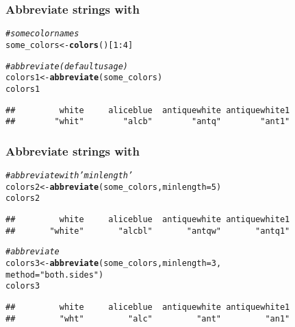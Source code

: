 \documentclass[12pt]{beamer}\usepackage[]{graphicx}\usepackage[]{color}
\makeatletter
\newcommand{\hlnum}[1]{\textcolor[rgb]{0.686,0.059,0.569}{#1}}%
\newcommand{\hlstr}[1]{\textcolor[rgb]{0.192,0.494,0.8}{#1}}%
\newcommand{\hlcom}[1]{\textcolor[rgb]{0.678,0.584,0.686}{\textit{#1}}}%
\newcommand{\hlopt}[1]{\textcolor[rgb]{0,0,0}{#1}}%
\newcommand{\hlstd}[1]{\textcolor[rgb]{0.345,0.345,0.345}{#1}}%
\newcommand{\hlkwb}[1]{\textcolor[rgb]{0.69,0.353,0.396}{#1}}%
\newcommand{\hlkwc}[1]{\textcolor[rgb]{0.333,0.667,0.333}{#1}}%
\newcommand{\hlkwd}[1]{\textcolor[rgb]{0.737,0.353,0.396}{\textbf{#1}}}%
\newenvironment{kframe}{%
 \def\at@end@of@kframe{}%
 \ifinner\ifhmode%
  \def\at@end@of@kframe{\end{minipage}}%
  \begin{minipage}{\columnwidth}%
 \fi\fi%
 \def\FrameCommand##1{\hskip\@totalleftmargin \hskip-\fboxsep
 \colorbox{shadecolor}{##1}\hskip-\fboxsep
     \hskip-\linewidth \hskip-\@totalleftmargin \hskip\columnwidth}%
 \MakeFramed {\advance\hsize-\width
   \@totalleftmargin\z@ \linewidth\hsize
   \@setminipage}}%
 {\par\unskip\endMakeFramed%
 \at@end@of@kframe}
\newenvironment{knitrout}{}{} %
\makeatother
\begin{document}
\begin{frame}[fragile]
\frametitle{Abbreviate strings with }

\begin{knitrout}\footnotesize
{}\color{fgcolor}\begin{kframe}
\begin{alltt}
\hlcom{# some color names}
\hlstd{some_colors} \hlkwb{<-} \hlkwd{colors}\hlstd{()[}\hlnum{1}\hlopt{:}\hlnum{4}\hlstd{]}

\hlcom{# abbreviate (default usage)}
\hlstd{colors1} \hlkwb{<-} \hlkwd{abbreviate}\hlstd{(some_colors)}
\hlstd{colors1}
\end{alltt}
\begin{verbatim}
##         white     aliceblue  antiquewhite antiquewhite1 
##        "whit"        "alcb"        "antq"        "ant1"
\end{verbatim}
\end{kframe}
\end{knitrout}

\end{frame}


\begin{frame}[fragile]
\frametitle{Abbreviate strings with }

\begin{knitrout}\footnotesize
{}\color{fgcolor}\begin{kframe}
\begin{alltt}
\hlcom{# abbreviate with 'minlength'}
\hlstd{colors2} \hlkwb{<-} \hlkwd{abbreviate}\hlstd{(some_colors,} \hlkwc{minlength} \hlstd{=} \hlnum{5}\hlstd{)}
\hlstd{colors2}
\end{alltt}
\begin{verbatim}
##         white     aliceblue  antiquewhite antiquewhite1 
##       "white"       "alcbl"       "antqw"       "antq1"
\end{verbatim}
\begin{alltt}
\hlcom{# abbreviate}
\hlstd{colors3} \hlkwb{<-} \hlkwd{abbreviate}\hlstd{(some_colors,} \hlkwc{minlength} \hlstd{=} \hlnum{3}\hlstd{,}
                      \hlkwc{method} \hlstd{=} \hlstr{"both.sides"}\hlstd{)}
\hlstd{colors3}
\end{alltt}
\begin{verbatim}
##         white     aliceblue  antiquewhite antiquewhite1 
##         "wht"         "alc"         "ant"         "an1"
\end{verbatim}
\end{kframe}
\end{knitrout}

\end{frame}
\end{document}
